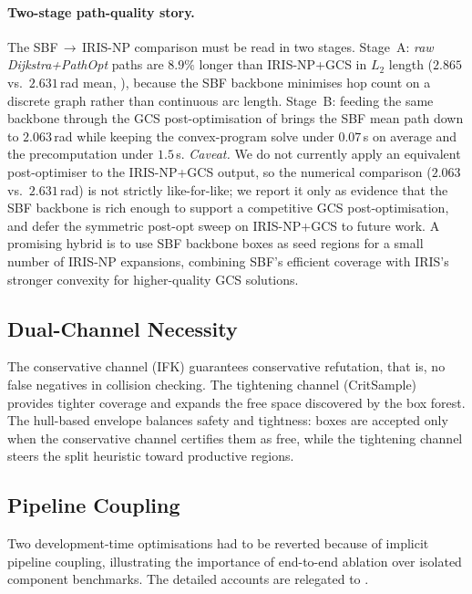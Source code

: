 \documentclass[journal]{IEEEtran}
\begin{document}
\paragraph{Two-stage path-quality story.} The SBF\,$\to$\,IRIS-NP
comparison must be read in two stages. Stage~A: \emph{raw
Dijkstra+PathOpt} paths are $8.9\%$ longer than IRIS-NP+GCS in $L_2$
length ($2.865$ vs.\ $2.631$\,rad mean, ),
because the SBF backbone minimises hop count on a discrete graph
rather than continuous arc length.
Stage~B: feeding the same backbone through the GCS post-optimisation
of  brings the SBF mean path down to
$2.063$\,rad while keeping the convex-program solve under $0.07$\,s
on average and the precomputation under $1.5$\,s.
\emph{Caveat.} We do not currently apply an equivalent post-optimiser
to the IRIS-NP+GCS output, so the numerical comparison
($2.063$ vs.\ $2.631$\,rad) is not strictly like-for-like; we report
it only as evidence that the SBF backbone is rich enough to support
a competitive GCS post-optimisation, and defer the symmetric
post-opt sweep on IRIS-NP+GCS to future work.
A promising hybrid is to use SBF backbone boxes as seed regions
for a small number of IRIS-NP expansions, combining SBF's efficient
coverage with IRIS's stronger convexity for higher-quality GCS solutions.

\subsection{Dual-Channel Necessity}

The conservative channel (IFK) guarantees conservative refutation,
that is, no false negatives in collision checking.
The tightening channel (CritSample) provides tighter coverage and
expands the free space discovered by the box forest.
The hull-based envelope balances safety and tightness:
boxes are accepted only when the conservative channel certifies them as
free, while the tightening channel steers the split heuristic toward
productive regions.

\subsection{Pipeline Coupling}

Two development-time optimisations had to be reverted because of
implicit pipeline coupling, illustrating the importance of end-to-end
ablation over isolated component benchmarks. The detailed accounts are
relegated to .
\end{document}
